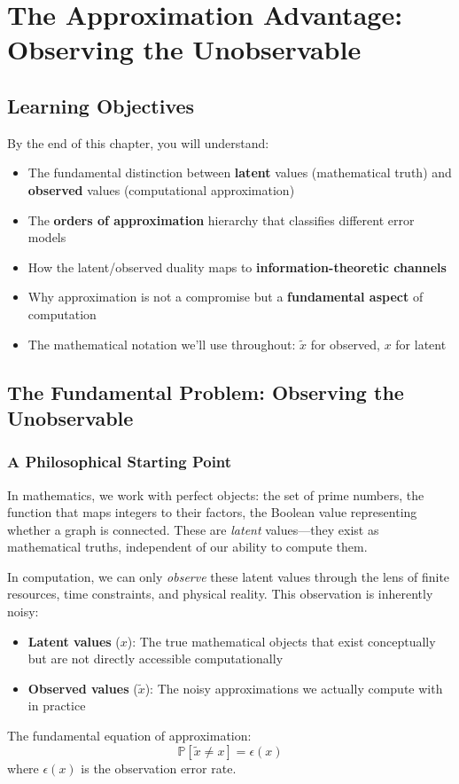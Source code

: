 \chapter{The Approximation Advantage: Observing the Unobservable}
\label{ch:approximation-advantage}

\section{Learning Objectives}

By the end of this chapter, you will understand:
\begin{itemize}
\item The fundamental distinction between \textbf{latent} values (mathematical truth) and \textbf{observed} values (computational approximation)
\item The \textbf{orders of approximation} hierarchy that classifies different error models
\item How the latent/observed duality maps to \textbf{information-theoretic channels}
\item Why approximation is not a compromise but a \textbf{fundamental aspect} of computation
\item The mathematical notation we'll use throughout: $\tilde{x}$ for observed, $x$ for latent
\end{itemize}

\section{The Fundamental Problem: Observing the Unobservable}

\subsection{A Philosophical Starting Point}

In mathematics, we work with perfect objects: the set of prime numbers, the function that maps integers to their factors, the Boolean value representing whether a graph is connected. These are \textit{latent} values—they exist as mathematical truths, independent of our ability to compute them.

In computation, we can only \textit{observe} these latent values through the lens of finite resources, time constraints, and physical reality. This observation is inherently noisy:

\begin{definition}
\begin{itemize}
\item \textbf{Latent values} ($x$): The true mathematical objects that exist conceptually but are not directly accessible computationally
\item \textbf{Observed values} ($\tilde{x}$): The noisy approximations we actually compute with in practice
\end{itemize}
The fundamental equation of approximation:
\begin{equation}
\mathbb{P}[\tilde{x} \neq x] = \epsilon(x)
\end{equation}
where $\epsilon(x)$ is the observation error rate.
\end{definition}

